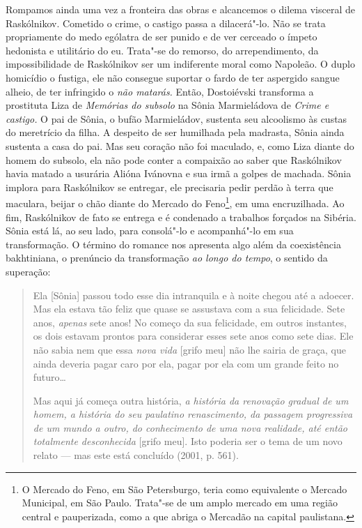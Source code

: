 Rompamos ainda uma vez a fronteira das obras e alcancemos o dilema
visceral de Raskólnikov. Cometido o crime, o castigo passa a
dilacerá"-lo. Não se trata propriamente do medo ególatra de ser punido e
de ver cerceado o ímpeto hedonista e utilitário do eu. Trata"-se do
remorso, do arrependimento, da impossibilidade de Raskólnikov ser um
indiferente moral como Napoleão. O duplo homicídio o fustiga, ele não
consegue suportar o fardo de ter aspergido sangue alheio, de ter
infringido o \emph{não matarás.} Então, Dostoiévski transforma a
prostituta Liza de \emph{Memórias do subsolo} na Sônia Marmieládova de
\emph{Crime e castigo.} O pai de Sônia, o bufão Marmieládov, sustenta
seu alcoolismo às custas do meretrício da filha. A despeito de ser
humilhada pela madrasta, Sônia ainda sustenta a casa do pai. Mas seu
coração não foi maculado, e, como Liza diante do homem do subsolo, ela
não pode conter a compaixão ao saber que Raskólnikov havia matado a
usurária Alióna Ivánovna e sua irmã a golpes de machada. Sônia implora
para Raskólnikov se entregar, ele precisaria pedir perdão à terra que
maculara, beijar o chão diante do Mercado do Feno\footnote{O Mercado do
  Feno, em São Petersburgo, teria como equivalente o Mercado Municipal,
  em São Paulo. Trata"-se de um amplo mercado em uma região central e
  pauperizada, como a que abriga o Mercadão na capital paulistana.}, em
uma encruzilhada. Ao fim, Raskólnikov de fato se entrega e é condenado a
trabalhos forçados na Sibéria. Sônia está lá, ao seu lado, para
consolá"-lo e acompanhá"-lo em sua transformação. O término do romance nos
apresenta algo além da coexistência bakhtiniana, o prenúncio da
transformação \emph{ao longo do tempo}, o sentido da superação:

\begin{quote}
Ela {[}Sônia{]} passou todo esse dia intranquila e à noite chegou até a
adoecer. Mas ela estava tão feliz que quase se assustava com a sua
felicidade. Sete anos, \emph{apenas} sete anos! No começo da sua
felicidade, em outros instantes, os dois estavam prontos para considerar
esses sete anos como sete dias. Ele não sabia nem que essa \emph{nova
vida} {[}grifo meu{]} não lhe sairia de graça, que ainda deveria pagar
caro por ela, pagar por ela com um grande feito no futuro\ldots

\noindent Mas aqui já começa outra história, \emph{a história da renovação gradual
de um homem, a história do seu paulatino renascimento, da passagem
progressiva de um mundo a outro, do conhecimento de uma nova realidade,
até então totalmente desconhecida} {[}grifo meu{]}. Isto poderia ser o
tema de um novo relato --- mas este está concluído (2001, p. 561).
\end{quote}

